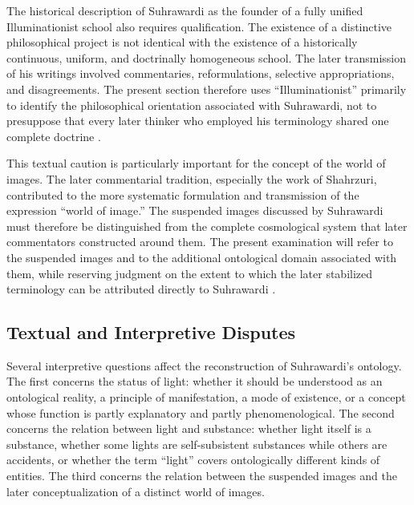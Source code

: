 \label{para:VS.B01.P01.C08.S14.SS02.P004}

The historical description of Suhrawardi as the founder of a
fully unified Illuminationist school also requires qualification.
The existence of a distinctive philosophical project is not
identical with the existence of a historically continuous,
uniform, and doctrinally homogeneous school. The later
transmission of his writings involved commentaries,
reformulations, selective appropriations, and disagreements.
The present section therefore uses ``Illuminationist'' primarily
to identify the philosophical orientation associated with
Suhrawardi, not to presuppose that every later thinker who
employed his terminology shared one complete doctrine
\citep{MarcotteSuhrawardiSEP2019,VanLitWorldImage2017}.

\label{para:VS.B01.P01.C08.S14.SS02.P005}

This textual caution is particularly important for the concept
of the world of images. The later commentarial tradition,
especially the work of Shahrzuri, contributed to the more
systematic formulation and transmission of the expression
``world of image.'' The suspended images discussed by
Suhrawardi must therefore be distinguished from the complete
cosmological system that later commentators constructed around
them. The present examination will refer to the suspended
images and to the additional ontological domain associated
with them, while reserving judgment on the extent to which
the later stabilized terminology can be attributed directly
to Suhrawardi \citep{VanLitWorldImage2017}.


\subsection{Textual and Interpretive Disputes}
\label{sec:ch08-s14-ss03}

\label{para:VS.B01.P01.C08.S14.SS03.P001}

Several interpretive questions affect the reconstruction of
Suhrawardi's ontology. The first concerns the status of light:
whether it should be understood as an ontological reality,
a principle of manifestation, a mode of existence, or a
concept whose function is partly explanatory and partly
phenomenological. The second concerns the relation between
light and substance: whether light itself is a substance,
whether some lights are self-subsistent substances while
others are accidents, or whether the term ``light'' covers
ontologically different kinds of entities. The third concerns
the relation between the suspended images and the later
conceptualization of a distinct world of images.

